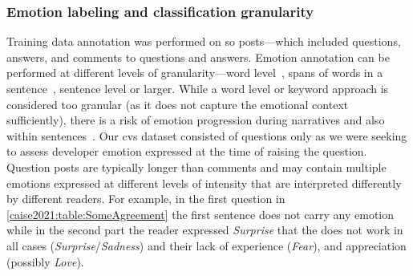 \subsubsection{Emotion labeling and classification granularity}
Training data annotation was performed on \gls{so} posts---which included questions, answers, and comments to questions and answers.
Emotion annotation can be performed at different levels of granularity---word level~\citep{StrapparavaWordNet-Affect:WordNet}, spans of words in a sentence~\citep{Aman2007IdentifyingText}, sentence level or larger.  While a word level or keyword approach is considered too granular (as it does not capture the emotional context sufficiently), there is a risk of emotion progression during narratives and also within sentences~\citep{Aman2007IdentifyingText, murgia2014}.  Our \gls{cvs} dataset consisted of questions only as we were seeking to assess developer emotion expressed at the time of raising the question.  Question posts are typically longer than comments and may contain multiple emotions expressed at different levels of intensity that are interpreted differently by different readers.  For example, in the first question in \cref{caise2021:table:SomeAgreement} the first sentence does not carry any emotion while in the second part the reader expressed \textit{Surprise} that the  does not work in all cases (\textit{Surprise}/\textit{Sadness}) and their lack of experience (\textit{Fear}), and appreciation (possibly \textit{Love}).   

